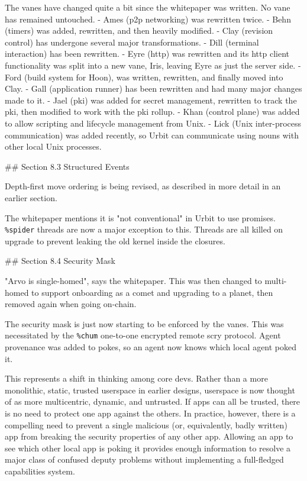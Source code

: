 \documentclass[twoside]{article}
\begin{document}
The vanes have changed quite a bit since the whitepaper was written.  No vane has remained untouched.
- Ames (p2p networking) was rewritten twice.
- Behn (timers) was added, rewritten, and then heavily modified.
- Clay (revision control) has undergone several major transformations.
- Dill (terminal interaction) has been rewritten.
- Eyre ({\sc http}) was rewritten and its {\sc http} client functionality was split into a new vane, Iris, leaving Eyre as just the server side.
- Ford (build system for Hoon), was written, rewritten, and finally moved into Clay.
- Gall (application runner) has been rewritten and had many major changes made to it.
- Jael ({\sc pki}) was added for secret management, rewritten to track the {\sc pki}, then modified to work with the {\sc pki} rollup.  
- Khan (control plane) was added to allow scripting and lifecycle management from Unix.
- Lick (Unix inter-process communication) was added recently, so Urbit can communicate using nouns with other local Unix processes.

## Section 8.3 Structured Events

Depth-first move ordering is being revised, as described in more detail in an earlier section.

The whitepaper mentions it is "not conventional" in Urbit to use promises.  \lstinline[style=inlinecode]{%spider} threads are now a major exception to this.  Threads are all killed on upgrade to prevent leaking the old kernel inside the closures.

## Section 8.4 Security Mask

"Arvo is single-homed", says the whitepaper.  This was then changed to multi-homed to support onboarding as a comet and upgrading to a planet, then removed again when going on-chain.

The security mask is just now starting to be enforced by the vanes.  This was necessitated by the \lstinline[style=inlinecode]{%chum} one-to-one encrypted remote scry protocol.  Agent provenance was added to pokes, so an agent now knows which local agent poked it.

This represents a shift in thinking among core devs.  Rather than a more monolithic, static, trusted userspace in earlier designs, userspace is now thought of as more multicentric, dynamic, and untrusted.  If apps can all be trusted, there is no need to protect one app against the others.  In practice, however, there is a compelling need to prevent a single malicious (or, equivalently, badly written) app from breaking the security properties of any other app.  Allowing an app to see which other local app is poking it provides enough information to resolve a major class of confused deputy problems without implementing a full-fledged capabilities system.
\end{document}

